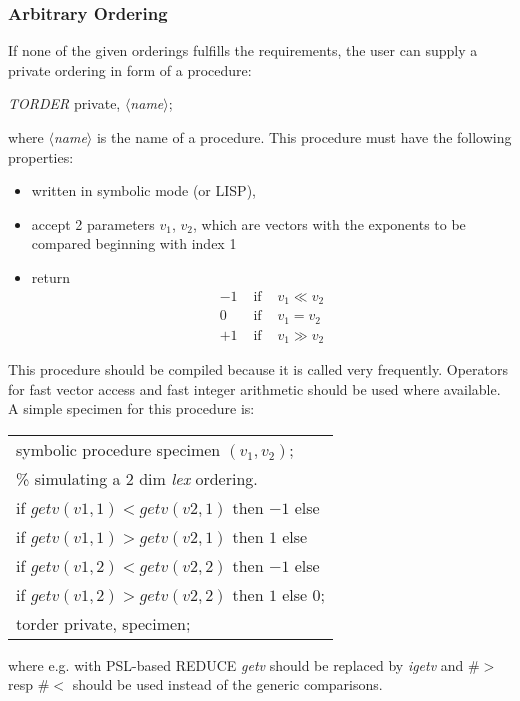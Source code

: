 \subsubsection{Arbitrary Ordering}
If none of the given orderings fulfills the requirements, the user can
supply a private ordering in form of a procedure:
\begin{center}
{\it TORDER} private, $\langle${\it name}$\rangle$;
\end{center}
where $\langle${\it name}$\rangle$ is the name of  a procedure. This
procedure must have the following properties:
\begin{itemize}
\item written in symbolic mode (or LISP),
\item accept 2 parameters $v_1$, $v_2$, which are vectors with the
exponents to be compared beginning with index 1
\item return
\[
\begin{array}{rll}
-1 & \mbox{ if } & v_1 \ll v_2 \\
 0 & \mbox{ if } & v_1 = v_2 \\
+1 & \mbox{ if } & v_1 \gg v_2
\end{array}
\]
\end{itemize}
This procedure should be compiled because it is called very frequently.
Operators for fast vector access and fast integer arithmetic should be
used where available. A simple specimen for this procedure is:
 \begin{center}
\begin{tabular}{l}
\hspace*{-1cm}symbolic procedure specimen $(v_1,v_2)$;
\vspace*{1mm}\\
\% simulating a 2 dim {\it lex} ordering. \\
if $getv(v1,1) < getv(v2,1)$ then $-1$ else \\
if $getv(v1,1) > getv(v2,1)$ then $1$ else \\
if $getv(v1,2) < getv(v2,2)$ then $-1$ else \\
if $getv(v1,2) > getv(v2,2)$ then $1$ else 0; \vspace*{2mm} \\
\hspace*{-1cm}torder private, specimen;
\end{tabular}
\end{center}


where e.g. with PSL-based REDUCE {\it getv} should be replaced by {\it
igetv} and $\#>$ resp $\#<$ should be used instead of the generic
comparisons.

